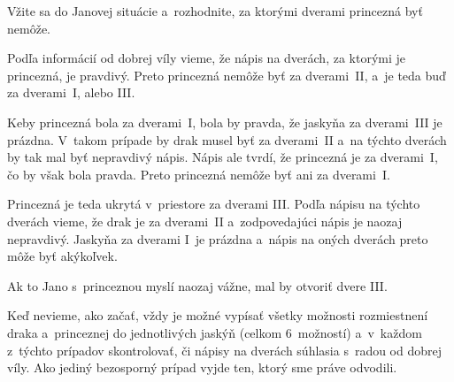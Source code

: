 {%
\napad
Vžite sa do Janovej situácie a~rozhodnite, za ktorými dverami princezná byť
nemôže.

\riesenie
Podľa informácií od dobrej víly vieme, že nápis na dverách, za ktorými je
princezná, je pravdivý.
Preto princezná nemôže byť za dverami~II, a~je teda buď za dverami~I, alebo III.

Keby princezná bola za dverami~I, bola by pravda, že jaskyňa za dverami~III je
prázdna.
V~takom prípade by drak musel byť za dverami~II a~na týchto dverách by tak
mal byť nepravdivý nápis.
Nápis ale tvrdí, že princezná je za dverami~I, čo by však bola pravda.
Preto princezná nemôže byť ani za dverami~I.

Princezná je teda ukrytá v~priestore za dverami III.
Podľa nápisu na týchto dverách vieme, že drak je za dverami~II a~zodpovedajúci
nápis je naozaj nepravdivý.
Jaskyňa za dverami I~je prázdna a~nápis na oných dverách preto môže byť akýkoľvek.

Ak to Jano s~princeznou myslí naozaj vážne, mal by otvoriť dvere III.

\poznamka
Keď nevieme, ako začať, vždy je možné vypísať všetky možnosti rozmiestnení
draka a~princeznej do jednotlivých jaskýň (celkom 6~možností) a~v~každom
z~týchto prípadov skontrolovať, či nápisy na dverách súhlasia s~radou od
dobrej víly.
Ako jediný bezosporný prípad vyjde ten, ktorý sme práve odvodili.
}

